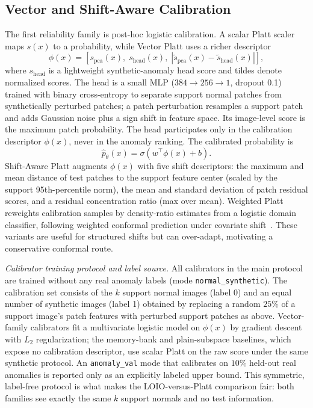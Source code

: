 \subsection{Vector and Shift-Aware Calibration}
The first reliability family is post-hoc logistic calibration. A scalar Platt scaler maps $s(x)$ to a probability, while Vector Platt uses a richer descriptor
\begin{equation}
    \phi(x)=\left[s_{\mathrm{pca}}(x),\; s_{\mathrm{head}}(x),\; |\tilde{s}_{\mathrm{pca}}(x)-\tilde{s}_{\mathrm{head}}(x)|\right],
\end{equation}
where $s_{\mathrm{head}}$ is a lightweight synthetic-anomaly head score and tildes denote normalized scores. The head is a small MLP ($384{\to}256{\to}1$, dropout 0.1) trained with binary cross-entropy to separate support normal patches from synthetically perturbed patches; a patch perturbation resamples a support patch and adds Gaussian noise plus a sign shift in feature space. Its image-level score is the maximum patch probability. The head participates only in the calibration descriptor $\phi(x)$, never in the anomaly ranking. The calibrated probability is
\begin{equation}
    \hat{p}_{\theta}(x)=\sigma(w^{\top}\phi(x)+b).
\end{equation}
Shift-Aware Platt augments $\phi(x)$ with five shift descriptors: the maximum and mean distance of test patches to the support feature center (scaled by the support 95th-percentile norm), the mean and standard deviation of patch residual scores, and a residual concentration ratio (max over mean). Weighted Platt reweights calibration samples by density-ratio estimates from a logistic domain classifier, following weighted conformal prediction under covariate shift~\cite{tibshirani2019covariate}. These variants are useful for structured shifts but can over-adapt, motivating a conservative conformal route.

\emph{Calibrator training protocol and label source.} All calibrators in the main protocol are trained without any real anomaly labels (mode \texttt{normal\_synthetic}). The calibration set consists of the $k$ support normal images (label 0) and an equal number of synthetic images (label 1) obtained by replacing a random $25\%$ of a support image's patch features with perturbed support patches as above. Vector-family calibrators fit a multivariate logistic model on $\phi(x)$ by gradient descent with $L_2$ regularization; the memory-bank and plain-subspace baselines, which expose no calibration descriptor, use scalar Platt on the raw score under the same synthetic protocol. An \texttt{anomaly\_val} mode that calibrates on $10\%$ held-out real anomalies is reported only as an explicitly labeled upper bound. This symmetric, label-free protocol is what makes the LOIO-versus-Platt comparison fair: both families see exactly the same $k$ support normals and no test information.

